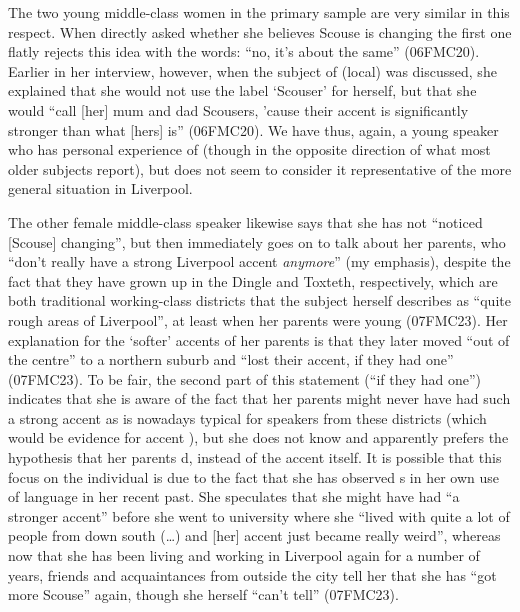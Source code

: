The two young middle-class women in the primary sample are very similar in this respect.
When directly asked whether she believes Scouse is changing the first one flatly rejects this idea with the words: ``no, it's about the same'' (06FMC20).
Earlier in her interview, however, when the subject of (local)  was discussed, she explained that she would not use the label `Scouser' for herself, but that she would ``call [her] mum and dad Scousers, 'cause their accent is significantly stronger than what [hers] is'' (06FMC20).
We have thus, again, a young speaker who has personal experience of   (though in the opposite direction of what most older subjects report), but does not seem to consider it representative of the more general situation in Liverpool.

The other female middle-class speaker likewise says that she has not ``noticed [Scouse] changing'', but then immediately goes on to talk about her parents, who ``don't really have a strong Liverpool accent \emph{anymore}'' (my emphasis), despite the fact that they have grown up in the Dingle and Toxteth, respectively, which are both traditional working-class districts that the subject herself describes as ``quite rough areas of Liverpool'', at least when her parents were young (07FMC23).
Her explanation for the `softer' accents of her parents is that they later moved ``out of the centre'' to a northern suburb and ``lost their accent, if they had one'' (07FMC23).
To be fair, the second part of this statement (``if they had one'') indicates that she is aware  of the fact that her parents might never have had such a strong accent as is nowadays typical for speakers from these districts (which would be evidence for accent ), but she does not know and apparently prefers the hypothesis that her parents d, instead of the accent itself.
It is possible that this focus on the individual is due to the fact that she has observed s in her own use of language in her recent past.
She speculates that she might have had ``a stronger accent'' before she went to university where she ``lived with quite a lot of people from down south (\ldots) and [her] accent just became really weird'', whereas now that she has been living and working in Liverpool again for a number of years, friends and acquaintances from outside the city tell her that she has ``got more Scouse'' again, though she herself ``can't tell'' (07FMC23).

